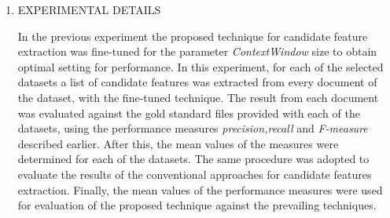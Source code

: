 \documentclass{ieeeaccess}
\begin{document}
\begin{enumerate}

	\item{EXPERIMENTAL DETAILS}
	
In the previous experiment the proposed technique for candidate feature extraction was fine-tuned for the parameter \textit{ContextWindow} size to obtain optimal setting for performance. In this experiment, for each of the selected datasets a list of candidate features was extracted from every document of the dataset, with the fine-tuned technique. The result from each document was evaluated against the gold standard files provided with each of the datasets, using the performance measures \textit{precision,recall} and \textit{F-measure} described earlier. After this, the mean values of the measures were determined for each of the datasets. The same procedure was adopted to evaluate the results of the conventional  approaches for candidate features extraction. Finally, the mean values of the performance measures were used for evaluation of the proposed technique against the prevailing techniques.



\end{enumerate}
\end{document}
